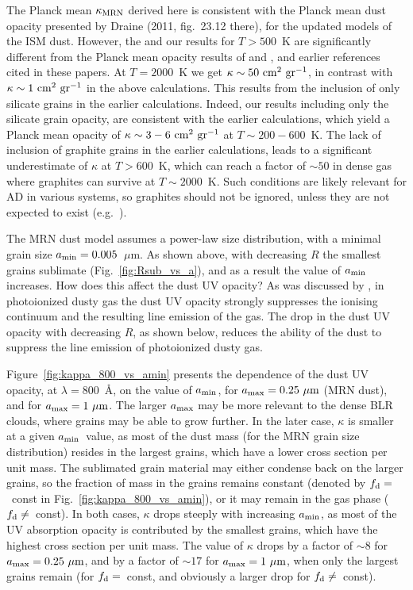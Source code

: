\documentclass[a4paper,fleqn,usenatbib]{mnras}
\newcommand{\amin}{\mbox{$a_{\rm min}$}}
\newcommand{\amax}{\mbox{$a_{\rm max}$}}
\newcommand{\mic}{\mbox{$\mu$m}}
\begin{document}
The Planck mean $\kappa_{\rm MRN}$ derived here is consistent with the Planck mean dust opacity 
presented by Draine (2011, fig.~23.12 there), for the updated models of the ISM dust. However, 
the \citet{draine11} and our results for $T>500$~K 
are significantly different from the Planck mean opacity
results of \citet{Semenov03} and \citet{Ferguson05}, and earlier references cited in these papers.
At $T=2000$~K we get $\kappa\sim 50~{\rm cm}^2~{\rm gr}^{-1}$, in contrast with
$\kappa\sim 1~{\rm cm}^2~{\rm gr}^{-1}$ in the above calculations. This results from the inclusion
of only silicate grains in the earlier calculations. Indeed, our results including only the silicate
grain opacity, are consistent with the earlier calculations, which yield a Planck mean opacity of
$\kappa\sim 3-6~{\rm cm}^2~{\rm gr}^{-1}$ at $T\sim 200-600$~K. The lack of
inclusion of graphite grains in the earlier calculations, leads to a significant underestimate
of $\kappa$ at $T>600$~K, which can reach a factor of $\sim 50$ in dense gas where graphites
can survive at $T\sim 2000$~K. Such conditions are likely relevant for AD in various systems, 
so graphites should not be ignored, unless they are not expected  to exist (e.g.\ \citealt{Anderson17}).

The MRN dust model assumes a power-law size distribution, with a minimal grain size $\amin=0.005$~\mic. As shown above,
with decreasing $R$ the smallest grains sublimate (Fig.~\ref{fig:Rsub_vs_a}), and as a result the value of 
$\amin$ increases. How does this affect the dust UV opacity? As was discussed by \citet{NetzerLaor93},
in photoionized dusty gas the dust UV opacity strongly suppresses
the ionising continuum and the resulting line emission of the gas. The drop in the dust UV opacity with decreasing $R$, as shown below,
reduces the 
ability of the dust to suppress the line emission of photoionized dusty gas.


Figure~\ref{fig:kappa_800_vs_amin} presents the dependence of the dust UV opacity,
at $\lambda=800$~\AA, on the value of \amin, for $\amax=0.25~\mic$ (MRN dust), and for
$\amax=1~\mic$. The larger $\amax$ may be more relevant to the dense BLR clouds, 
where grains may be able to grow further. In the later case, 
$\kappa$ is smaller at a given \amin\ value, as most of the dust mass (for the MRN grain size distribution)
resides in the largest grains, which have a lower cross section per unit mass.
The sublimated grain material may either condense back on the larger grains,
so the fraction of mass in the grains remains constant (denoted by $f_{\rm d}=$~const in Fig.~\ref{fig:kappa_800_vs_amin}), or it may remain 
in the gas phase ($f_{\rm d}\ne $~const). In both cases, $\kappa$ drops steeply with increasing \amin, as 
most of the UV absorption opacity is contributed by the smallest grains, which have the highest cross section
per unit mass. 
The value of $\kappa$ drops by a factor of $\sim 8$ for $\amax=0.25~\mic$, and by a factor of $\sim 17$ for $\amax=1~\mic$, when only the largest grains remain (for $f_{\rm d}=$~const, 
and obviously a larger drop for $f_{\rm d}\ne $~const). 
\end{document}
